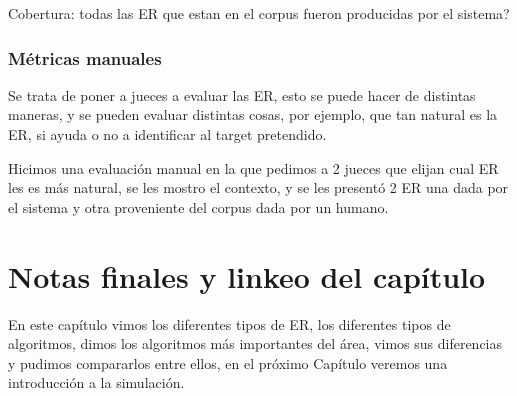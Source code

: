 Cobertura: todas las ER que estan en el corpus fueron producidas por el sistema?







\subsubsection{M\'etricas manuales}

Se trata de poner a jueces a evaluar las ER, esto se puede hacer de distintas maneras, y se pueden evaluar distintas cosas, por ejemplo, que tan natural es la ER, si ayuda o no a identificar al target pretendido. 

Hicimos una evaluaci\'on manual en la que pedimos a 2 jueces que elijan cual ER les es m\'as natural, se les mostro el contexto, y se les present\'o 2 ER una dada por el sistema y otra proveniente del corpus dada por un humano.


\section{Notas finales y linkeo del cap\'itulo}

En este cap\'itulo vimos los diferentes tipos de ER, los diferentes tipos de algoritmos, dimos los algoritmos m\'as importantes del \'area, vimos sus diferencias y pudimos compararlos entre ellos, en el pr\'oximo Cap\'itulo veremos una introducci\'on a la simulaci\'on.
